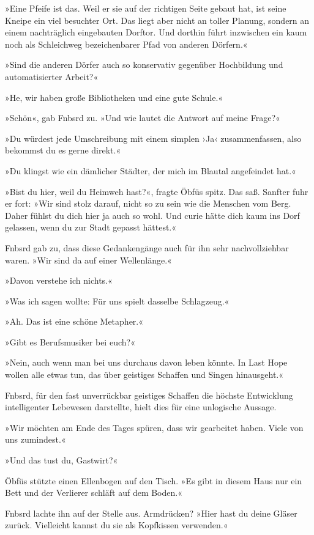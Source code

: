 »Eine Pfeife ist das. Weil er sie auf der richtigen Seite gebaut hat, ist seine Kneipe ein viel besuchter Ort. Das liegt aber nicht an toller Planung, sondern an einem nachträglich eingebauten Dorftor. Und dorthin führt inzwischen ein kaum noch als Schleichweg bezeichenbarer Pfad von anderen Dörfern.«

»Sind die anderen Dörfer auch so konservativ gegenüber Hochbildung und automatisierter Arbeit?«

»He, wir haben große Bibliotheken und eine gute Schule.«

»Schön«, gab Fnbsrd zu. »Und wie lautet die Antwort auf meine Frage?«

»Du würdest jede Umschreibung mit einem simplen ›Ja‹ zusammenfassen, also bekommst du es gerne direkt.«

»Du klingst wie ein dämlicher Städter, der mich im Blautal angefeindet hat.«

»Bist du hier, weil du Heimweh hast?«, fragte Öbfüs spitz. Das saß. Sanfter fuhr er fort: »Wir sind stolz darauf, nicht so zu sein wie die Menschen vom Berg. Daher fühlst du dich hier ja auch so wohl. Und curie hätte dich kaum ins Dorf gelassen, wenn du zur Stadt gepasst hättest.«

Fnbsrd gab zu, dass diese Gedankengänge auch für ihn sehr nachvollziehbar waren. »Wir sind da auf einer Wellenlänge.«

»Davon verstehe ich nichts.«

»Was ich sagen wollte: Für uns spielt dasselbe Schlagzeug.«

»Ah. Das ist eine schöne Metapher.«

»Gibt es Berufsmusiker bei euch?«

»Nein, auch wenn man bei uns durchaus davon leben könnte. In Last Hope wollen alle etwas tun, das über geistiges Schaffen und Singen hinausgeht.«

Fnbsrd, für den fast unverrückbar geistiges Schaffen die höchste Entwicklung intelligenter Lebewesen darstellte, hielt dies für eine unlogische Aussage.

»Wir möchten am Ende des Tages spüren, dass wir gearbeitet haben. Viele von uns zumindest.«

»Und das tust du, Gastwirt?«

Öbfüs stützte einen Ellenbogen auf den Tisch. »Es gibt in diesem Haus nur ein Bett und der Verlierer schläft auf dem Boden.«

Fnbsrd lachte ihn auf der Stelle aus. Armdrücken? »Hier hast du deine Gläser zurück. Vielleicht kannst du sie als Kopfkissen verwenden.«

